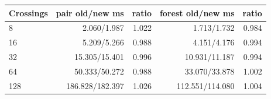 \begin{center}\small
\begin{tabular}{@{}lrrrr@{}}
\toprule
Crossings & pair old/new ms & ratio & forest old/new ms & ratio \\
\midrule
8 & 2.060/1.987 & 1.022 & 1.713/1.732 & 0.984 \\
16 & 5.209/5.266 & 0.988 & 4.151/4.176 & 0.994 \\
32 & 15.305/15.401 & 0.996 & 10.931/11.187 & 0.994 \\
64 & 50.333/50.272 & 0.988 & 33.070/33.878 & 1.002 \\
128 & 186.828/182.397 & 1.026 & 112.551/114.080 & 1.004 \\
\bottomrule
\end{tabular}
\end{center}
